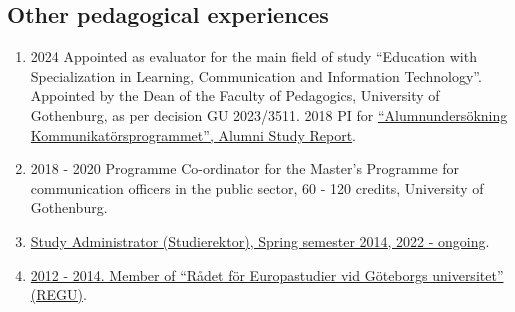 \documentclass[
]{article}
\providecommand{\tightlist}{%
  \setlength{\itemsep}{0pt}\setlength{\parskip}{0pt}}
\begin{document}
\hypertarget{other-pedagogical-experiences}{%
\subsection{Other pedagogical
experiences}\label{other-pedagogical-experiences}}

\begin{enumerate}
\def\labelenumi{\arabic{enumi}.}
\tightlist
\item
  2024 Appointed as evaluator for the main field of study ``Education
  with Specialization in Learning, Communication and Information
  Technology''. Appointed by the Dean of the Faculty of Pedagogics,
  University of Gothenburg, as per decision GU 2023/3511. 2018 PI for
  \href{https://gup.ub.gu.se/publication/273029}{``Alumnundersökning
  Kommunikatörsprogrammet'', Alumni Study Report}.
\item
  2018 - 2020 Programme Co-ordinator for the Master's Programme for
  communication officers in the public sector, 60 - 120 credits,
  University of Gothenburg.
\item
  \href{http://files.christopherkullenberg.se/studierektoronline.pdf}{Study
  Administrator (Studierektor), Spring semester 2014, 2022 - ongoing}.
\item
  \href{http://files.christopherkullenberg.se/IntygREGU.pdf}{2012 -
  2014. Member of ``Rådet för Europastudier vid Göteborgs universitet''
  (REGU)}.
\end{enumerate}
\end{document}
